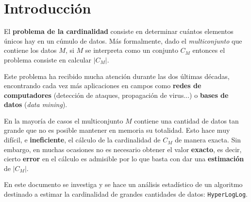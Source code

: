 % 
\section{Introducción}

El \textbf{problema de la cardinalidad} consiste en determinar cuántos elementos únicos hay en un cúmulo de
datos. Más formalmente, dado el \emph{multiconjunto} que contiene los datos $M$, si $M$ se interpreta como
un conjunto $C_M$ entonces el problema consiste en calcular $|C_M|$.

Este problema ha recibido mucha atención durante las dos últimas décadas, encontrando cada vez más
aplicaciones en campos como \textbf{redes de computadores} (detección de ataques, propagación de virus...) o
\textbf{bases de datos} (\emph{data mining}).

En la mayoría de casos el multiconjunto $M$ contiene una cantidad de datos tan grande que no es
posible mantener en memoria su totalidad. Esto hace muy difícil, e \textbf{ineficiente}, el cálculo de la
cardinalidad de $C_M$ de manera exacta. Sin embargo, en muchas ocasiones no es necesario obtener el valor
\textbf{exacto}, es decir, cierto \textbf{error} en el cálculo es admisible por lo que basta con dar una
\textbf{estimación} de $|C_M|$.

En este documento se investiga y se hace un análisis estadístico de un algoritmo destinado a estimar la
cardinalidad de grandes cantidades de datos: \texttt{HyperLogLog}.
